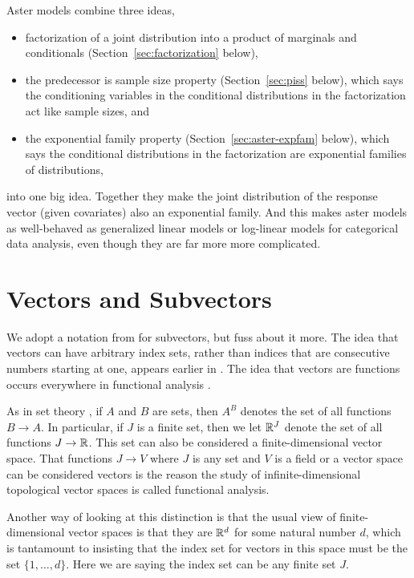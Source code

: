 Aster models combine three ideas,
\begin{itemize}
\item factorization of a joint distribution into a product of marginals
    and conditionals (Section~\ref{sec:factorization} below),
\item the predecessor is sample size property (Section~\ref{sec:piss} below),
    which says the conditioning variables in the conditional distributions
    in the factorization act like sample sizes, and
\item the exponential family property (Section~\ref{sec:aster-expfam} below),
    which says the conditional distributions in the factorization are
    exponential families of distributions,
\end{itemize}
into one big idea.  Together they make the joint distribution of the
response vector (given covariates) also an exponential family.
And this makes aster models
as well-behaved as generalized linear models or log-linear models for
categorical data analysis, even though they are far more more complicated.

\section{Vectors and Subvectors}
\label{sec:subvector}

We adopt a notation from \citet{lauritzen} for subvectors, but fuss about it
more.  The idea that vectors can have arbitrary index sets, rather than
indices that are consecutive numbers starting at one, appears earlier in
\citet{rockafellar-monotropic}.  The idea that vectors are functions
occurs everywhere in functional analysis \citep[Appendix~B]{rudin}.

As in set theory \citep[Section~8]{halmos-set-theory}, if $A$ and $B$
are sets, then $A^B$ denotes the set of all functions $B \to A$.
In particular, if $J$ is a finite set, then we let $\mathbb{R}^J$ denote
the set of all functions $J \to \mathbb{R}$.  This set can also be considered
a finite-dimensional vector space.  That functions $J \to V$ where $J$ is
any set and $V$ is a field or a vector space can be considered
vectors is the reason the study of infinite-dimensional topological vector
spaces is called functional analysis.

Another way of looking at this distinction is that the usual view of
finite-dimensional vector spaces is that they are $\mathbb{R}^d$ for some
natural number $d$, which is tantamount to insisting that the index
set for vectors in this space must be the set $\{1, \ldots, d\}$.
Here we are saying the index set can be any finite set $J$.

